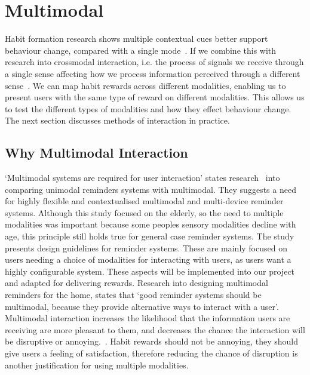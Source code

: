 
\newpage

\section{Multimodal}
Habit formation research shows multiple contextual cues better support behaviour change, compared with a single mode~\cite{article_understanding_use_contextual_cues_design_impl}. If we combine this with research into crossmodal interaction, i.e. the process of signals we receive through a single sense affecting how we process information perceived through a different sense~\cite{article_natural_cross_modal_mappings}. We can map habit rewards across different modalities, enabling us to present users with the same type of reward on different modalities. This allows us to test the different types of modalities and how they effect behaviour change. The next section discusses methods of interaction in practice.

\subsection{Why Multimodal Interaction}
`Multimodal systems are required for user interaction' states research~\cite{article_user_centred_multimodal_reminders} into comparing unimodal reminders systems with multimodal. They suggests a need for highly flexible and contextualised multimodal and multi-device reminder systems. Although this study focused on the elderly, so the need to multiple modalities was important because some peoples sensory modalities decline with age, this principle still holds true for general case reminder systems. The study presents design guidelines for reminder systems. These are mainly focused on users needing a choice of modalities for interacting with users, as users want a highly configurable system. These aspects will be implemented into our project and adapted for delivering rewards.\newline
\newline
Research into designing multimodal reminders for the home, states that `good reminder systems should be multimodal, because they provide alternative ways to interact with a user'. Multimodal interaction increases the likelihood that the information users are receiving are more pleasant to them, and decreases the chance the interaction will be disruptive or annoying.~\cite{article_designing_multimodal_reminders_for_home}. Habit rewards should not be annoying, they should give users a feeling of satisfaction, therefore reducing the chance of disruption is another justification for using multiple modalities.

